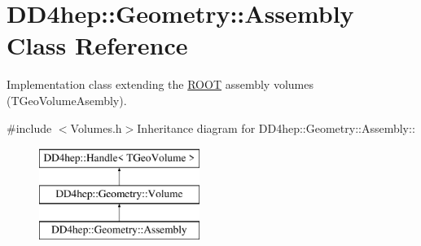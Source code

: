 \hypertarget{class_d_d4hep_1_1_geometry_1_1_assembly}{
\section{DD4hep::Geometry::Assembly Class Reference}
\label{class_d_d4hep_1_1_geometry_1_1_assembly}
}


Implementation class extending the \hyperlink{namespace_r_o_o_t}{ROOT} assembly volumes (TGeoVolumeAsembly).  


{\ttfamily \#include $<$Volumes.h$>$}Inheritance diagram for DD4hep::Geometry::Assembly::\begin{figure}[H]
\begin{center}
\leavevmode
\includegraphics[height=3cm]{class_d_d4hep_1_1_geometry_1_1_assembly}
\end{center}
\end{figure}
